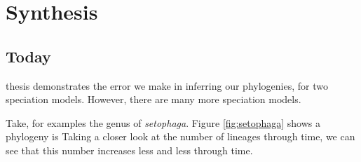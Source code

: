 \chapter{Synthesis}
\label{synthesis}

\newpage






\section{Today}

\noindent

 thesis demonstrates the error we make in 
inferring our phylogenies, for two speciation models.
However, there are many more speciation models.

Take, for examples the genus of \textit{setophaga}.
Figure \ref{fig:setophaga} shows a phylogeny is 
Taking a closer look at the number of lineages through time,
we can see that this number increases less and less through time.

